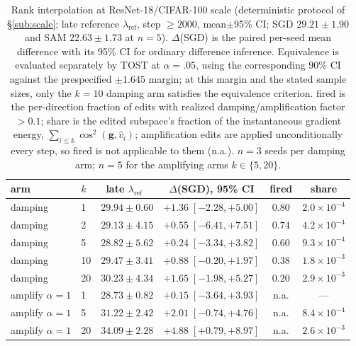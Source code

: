 \documentclass{article}
\theoremstyle{plain}
\theoremstyle{definition}
\theoremstyle{remark}
\newcommand{\lref}{\ensuremath{\lambda_{\mathrm{ref}}}}
\newcommand{\RTableTopGap}{%
  \setlength{\abovetopsep}{2pt}%
}
\newcommand{\RTableDenseRules}{%
  \setlength{\aboverulesep}{.55ex}%
  \setlength{\belowrulesep}{.75ex}%
}
\begin{document}
\begin{table}[!ht]
\centering\small
\caption{Rank interpolation at ResNet-18/CIFAR-100 scale (deterministic
protocol of \S\ref{sub:scale}; late reference \lref, step $\geq2000$,
mean$\pm$95\% CI; SGD $29.21\pm1.90$ and SAM $22.63\pm1.73$ at $n{=}5$).
$\Delta$(SGD) is the paired per-seed mean difference with its 95\% CI
for ordinary difference inference. Equivalence is evaluated separately
by TOST at $\alpha{=}.05$, using the corresponding 90\% CI against the
prespecified $\pm1.645$ margin; at this margin and the stated sample
sizes, only the $k{=}10$ damping arm satisfies the equivalence
criterion. fired is the per-direction fraction of edits with
realized damping/amplification factor $>0.1$; share is the edited subspace's
fraction of the instantaneous gradient energy,
$\sum_{i\le k}\cos^{2}(\mathbf{g},\hat v_{i})$; amplification edits are
applied unconditionally every step, so fired is not applicable to them
(n.a.). $n{=}3$ seeds per damping arm; $n{=}5$ for the amplifying arms
$k\in\{5,20\}$.}
\label{tab:interp}
{\renewcommand{\arraystretch}{1.14}\RTableTopGap\RTableDenseRules
\begin{tabular}{llcccc}
\toprule
arm & $k$ & late \lref\ & $\Delta$(SGD), 95\% CI & fired & share \\
\midrule
damping & 1  & $29.94\pm0.60$ & $+1.36\;[-2.28,+5.00]$ & $0.80$ & $2.0\!\times\!10^{-4}$ \\
damping & 2  & $29.13\pm4.15$ & $+0.55\;[-6.41,+7.51]$ & $0.74$ & $4.2\!\times\!10^{-4}$ \\
damping & 5  & $28.82\pm5.62$ & $+0.24\;[-3.34,+3.82]$ & $0.60$ & $9.3\!\times\!10^{-4}$ \\
damping & 10 & $29.47\pm3.41$ & $+0.88\;[-0.20,+1.97]$ & $0.38$ & $1.8\!\times\!10^{-3}$ \\
damping & 20 & $30.23\pm4.34$ & $+1.65\;[-1.98,+5.27]$ & $0.20$ & $2.9\!\times\!10^{-3}$ \\
\midrule
amplify $\alpha{=}1$ & 1  & $28.73\pm0.82$ & $+0.15\;[-3.64,+3.93]$ & n.a. & --- \\
amplify $\alpha{=}1$ & 5  & $31.22\pm2.42$ & $+2.01\;[-0.74,+4.76]$ & n.a. & $8.4\!\times\!10^{-4}$ \\
amplify $\alpha{=}1$ & 20 & $34.09\pm2.28$ & $+4.88\;[+0.79,+8.97]$ & n.a. & $2.6\!\times\!10^{-3}$ \\
\bottomrule
\end{tabular}}
\end{table}
\end{document}
